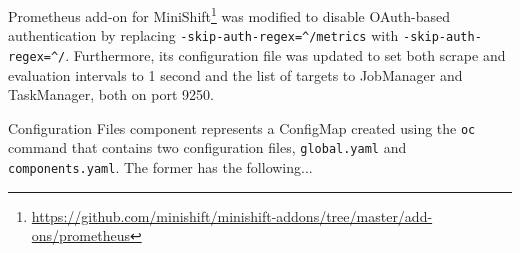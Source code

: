 \documentclass{article}
\begin{document}
Prometheus add-on for
MiniShift\footnote{\url{https://github.com/minishift/minishift-addons/tree/master/add-ons/prometheus}}
was modified to disable OAuth-based authentication by replacing
\texttt{-skip-auth-regex=\^{}/metrics} with \texttt{-skip-auth-regex=\^{}/}.
Furthermore, its configuration file was updated to set both scrape and
evaluation intervals to 1 second and the list of targets to JobManager and
TaskManager, both on port 9250.

Configuration Files component represents a ConfigMap created using the
\texttt{oc} command that contains two configuration files, \texttt{global.yaml}
and \texttt{components.yaml}. The former has the following...

\end{document}
